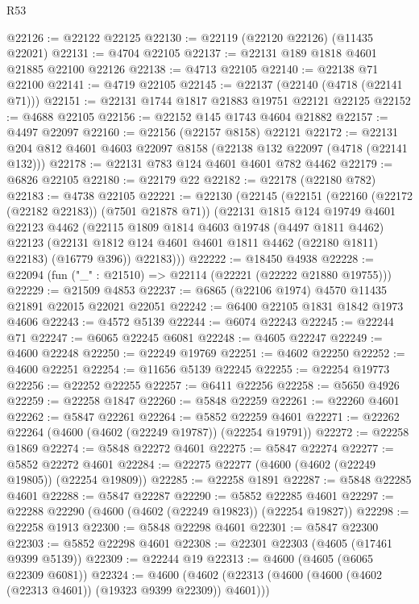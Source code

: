 \begin{lexlean}{R53}
\begin{coremodule}
@22126 := @22122 @22125
@22130 := @22119 (@22120 @22126) (@11435 @22021)
@22131 := @4704 @22105
@22137 := @22131 @189 @1818 @4601 @21885 @22100 @22126
@22138 := @4713 @22105
@22140 := @22138 @71 @22100
@22141 := @4719 @22105
@22145 := @22137 (@22140 (@4718 (@22141 @71)))
@22151 := @22131 @1744 @1817 @21883 @19751 @22121 @22125
@22152 := @4688 @22105
@22156 := @22152 @145 @1743 @4604 @21882
@22157 := @4497 @22097
@22160 := @22156 (@22157 @8158) @22121
@22172 := @22131 @204 @812 @4601 @4603 @22097 @8158 (@22138 @132 @22097 (@4718 (@22141 @132)))
@22178 := @22131 @783 @124 @4601 @4601 @782 @4462
@22179 := @6826 @22105
@22180 := @22179 @22
@22182 := @22178 (@22180 @782)
@22183 := @4738 @22105
@22221 := @22130
    (@22145
      (@22151
        (@22160 (@22172 (@22182 @22183)) (@7501 @21878 @71))
        (@22131
          @1815
          @124
          @19749
          @4601
          @22123
          @4462
          (@22115
            @1809
            @1814
            @4603
            @19748
            (@4497 @1811 @4462)
            @22123
            (@22131 @1812 @124 @4601 @4601 @1811 @4462 (@22180 @1811) @22183)
            (@16779 @396))
          @22183)))
@22222 := @18450 @4938
@22228 := @22094 (fun ("_" : @21510) => @22114 (@22221 (@22222 @21880 @19755)))
@22229 := @21509 @4853
@22237 := @6865 (@22106 @1974) @4570 @11435 @21891 @22015 @22021 @22051
@22242 := @6400 @22105 @1831 @1842 @1973 @4606
@22243 := @4572 @5139
@22244 := @6074 @22243
@22245 := @22244 @71
@22247 := @6065 @22245 @6081
@22248 := @4605 @22247
@22249 := @4600 @22248
@22250 := @22249 @19769
@22251 := @4602 @22250
@22252 := @4600 @22251
@22254 := @11656 @5139 @22245
@22255 := @22254 @19773
@22256 := @22252 @22255
@22257 := @6411 @22256
@22258 := @5650 @4926
@22259 := @22258 @1847
@22260 := @5848 @22259
@22261 := @22260 @4601
@22262 := @5847 @22261
@22264 := @5852 @22259 @4601
@22271 := @22262 @22264 (@4600 (@4602 (@22249 @19787)) (@22254 @19791))
@22272 := @22258 @1869
@22274 := @5848 @22272 @4601
@22275 := @5847 @22274
@22277 := @5852 @22272 @4601
@22284 := @22275 @22277 (@4600 (@4602 (@22249 @19805)) (@22254 @19809))
@22285 := @22258 @1891
@22287 := @5848 @22285 @4601
@22288 := @5847 @22287
@22290 := @5852 @22285 @4601
@22297 := @22288 @22290 (@4600 (@4602 (@22249 @19823)) (@22254 @19827))
@22298 := @22258 @1913
@22300 := @5848 @22298 @4601
@22301 := @5847 @22300
@22303 := @5852 @22298 @4601
@22308 := @22301 @22303 (@4605 (@17461 @9399 @5139))
@22309 := @22244 @19
@22313 := @4600 (@4605 (@6065 @22309 @6081))
@22324 := @4600 (@4602 (@22313 (@4600 (@4600 (@4602 (@22313 @4601)) (@19323 @9399 @22309)) @4601)))

\end{coremodule}
\end{lexlean}
